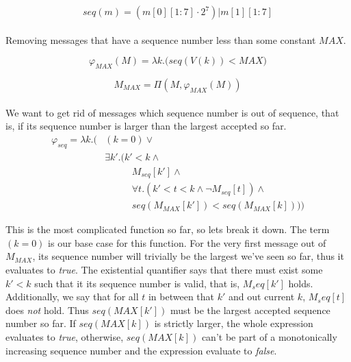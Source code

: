 \documentclass[fleqn]{kththesis}
\begin{document}
\begin{equation*}
	seq(m) = (m[0][1:7] \cdot 2^7) | m[1][1:7]
\end{equation*}

\paragraph{}
Removing messages that have a sequence number less than some constant $MAX$.

\begin{equation*}
	\varphi_{MAX}(M) = \lambda k . \Bigg(
		seq(V(k)) < MAX	
	\Bigg)
\end{equation*}

\begin{equation*}
	M_{MAX} = \varPi(M, \varphi_{MAX}(M))
\end{equation*}

\paragraph{}
We want to get rid of messages which sequence number is out of sequence, that is, if its sequence number is larger than the largest accepted so far.
\begin{equation*}
\begin{split}
	\varphi_{seq} = \lambda k . \Bigg( &(k=0) \lor \\
	& \exists k'. (k' < k \land  \\
	&\phantom{==}\, M_{seq}[k'] \land \\
	&\phantom{==}\, \forall t. (k' < t < k \land \neg M_{seq}[t]) \land \\
	&\phantom{==}\, seq(M_{MAX}[k']) < seq(M_{MAX}[k])) \Bigg)
\end{split}
\end{equation*}

This is the most complicated function so far, so lets break it down. The term $(k=0)$ is our base case for this function. For the very first message out of $M_{MAX}$, its sequence number will trivially be the largest we've seen so far, thus it evaluates to \emph{true}. The existential quantifier says that there must exist some $k' < k$ such that it its sequence number is valid, that is, $M_seq[k']$ holds. Additionally, we say that for all $t$ in between that $k'$ and out current $k$, $M_seq[t]$ does \emph{not} hold. Thus $seq({MAX}[k'])$ must be the largest accepted sequence number so far. If $seq({MAX}[k])$ is strictly larger, the whole expression evaluates to \emph{true}, otherwise, $seq({MAX}[k])$ can't be part of a monotonically increasing sequence number and the expression evaluate to \emph{false}.
\end{document}
